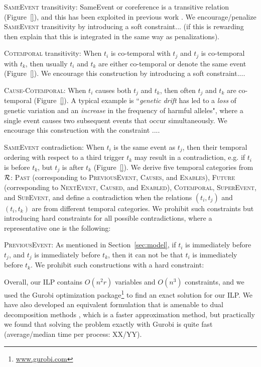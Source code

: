 \textsc{SameEvent} transitivity: SameEvent or coreference is a transitive relation (Figure~\ref{}), and this has been exploited in previous work \cite{Finkel08}. We encourage/penalize \textsc{SameEvent} transitivity by introducing a soft constraint... (if this is rewarding then explain that this is integrated in the same way as penalizations).

\textsc{Cotemporal} transitivity:  When $t_i$ is co-temporal with $t_j$ and $t_j$ is co-temporal with $t_k$, then usually $t_i$ and $t_k$ are either co-temporal or denote the same event (Figure~\ref{}). We encourage this construction by introducing a soft constraint....

\textsc{Cause}-\textsc{Cotemporal}: When $t_i$ causes both $t_j$ and $t_k$, then often $t_j$ and $t_k$ are co-temporal (Figure~\ref{}). A typical example is ``\emph{genetic drift} has led to a \emph{loss} of genetic variation and an \emph{increase} in the frequency of harmful alleles", where a single event causes two subsequent events that occur simultaneously. We encourage this construction with the constraint ....

\textsc{SameEvent} contradiction: When $t_i$ is the same event as  $t_j$, then their temporal ordering with respect to a third trigger $t_k$ may result in a contradiction, e.g. if $t_i$ is before $t_k$, but $t_j$ is after $t_k$ (Figure~\ref{}). We derive five temporal categories from $\mathcal{R}$: \textsc{Past} (corresponding to \textsc{PreviousEvent}, \textsc{Causes}, and \textsc{Enables}), \textsc{Future} (corresponding to \textsc{NextEvent}, \textsc{Caused}, and \textsc{Enabled}), \textsc{Cotemporal}, \textsc{SuperEvent}, and \textsc{SubEvent}, and define a contradiction when the relations $(t_i,t_j)$ and $(t_i,t_k)$ are from different temporal categories. We prohibit such constraints but introducing hard constraints for all possible contradictions, where a representative one is the following:

\textsc{PreviousEvent}: As mentioned in Section~\ref{sec:model}, if $t_i$ is immediately before $t_j$, and $t_j$ is immediately before $t_k$, then it can not be that $t_i$ is immediately before $t_k$. We prohibit such constructions with a hard constraint:

Overall, our ILP contains $O(n^2r)$ variables and $O(n^3)$ constraints, and we used the Gurobi optimization package\footnote{\url{www.gurobi.com}} to find an exact solution for our ILP. We have also developed an equivalent formulation that is amenable to dual decomposition methods \cite{Reichart12}, which is a faster approximation method, but practically we found that solving the problem exactly with Gurobi is quite fast (average/median time per process: XX/YY).



